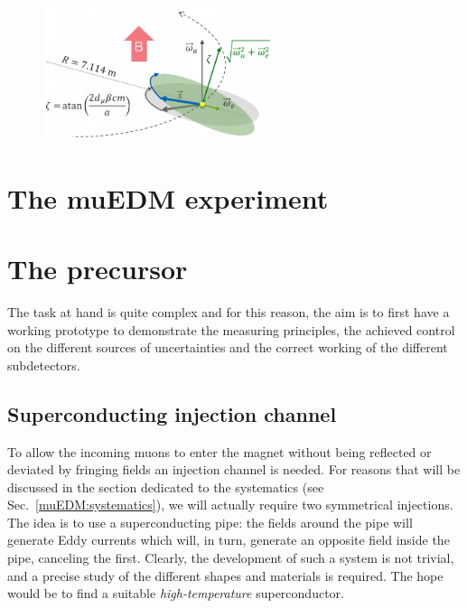 \begin{refsection}
        \begin{figure}
            \centering
            \includegraphics[width = 0.6\textwidth]{Figures/muEDM/g-2_EDM.png}
            \caption{}
            \label{fig:muEDM:g-2_EDM}
        \end{figure}
        
\section{The muEDM experiment}

\section{The precursor}
    The task at hand is quite complex and for this reason, the aim is to first have a working prototype to demonstrate the measuring principles, the achieved control on the different sources of uncertainties and the correct working of the different subdetectors.
    
    \subsection{Superconducting injection channel}
        To allow the incoming muons to enter the magnet without being reflected or deviated by fringing fields an injection channel is needed.
        For reasons that will be discussed in the section dedicated to the systematics (see Sec.~\ref{muEDM:systematics}), we will actually require two symmetrical injections.
        The idea is to use a superconducting pipe: the fields around the pipe will generate Eddy currents which will, in turn, generate an opposite field inside the pipe, canceling the first.
        Clearly, the development of such a system is not trivial, and a precise study of the different shapes and materials is required. 
        The hope would be to find a suitable \textit{high-temperature} superconductor.


\end{refsection}
